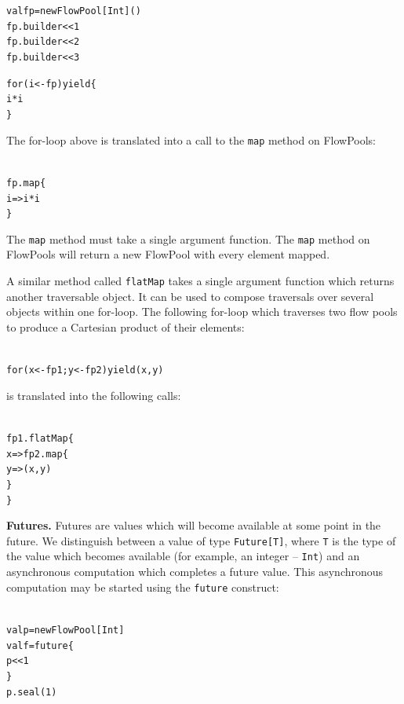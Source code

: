 \documentclass[runningheads,a4paper]{llncs}
\begin{document}
\begin{minipage}[b]{3.75 cm}
\begin{alltt}
{\scriptsize
val fp = new FlowPool[Int]()
fp.builder << 1
fp.builder << 2
fp.builder << 3

for (i <- fp) yield \{
  i * i
\}
}
\end{alltt}
\end{minipage}

The for-loop above is translated into a call to the \verb=map= method on FlowPools:

\begin{minipage}[b]{3.75 cm}
\begin{alltt}
{\scriptsize
fp.map \{
  i => i * i
\}
}
\end{alltt}
\end{minipage}

The \verb=map= method must take a single argument function.
The \verb=map= method on FlowPools will return a new FlowPool with every
element mapped.

A similar method called \verb=flatMap= takes a single argument function
which returns another traversable object.
It can be used to compose traversals over several objects within one
for-loop.
The following for-loop which traverses two flow pools to produce a
Cartesian product of their elements:

\begin{minipage}[b]{3.75 cm}
\begin{alltt}
{\scriptsize
for (x <- fp1; y <- fp2) yield (x, y)
}
\end{alltt}
\end{minipage}

is translated into the following calls:

\begin{minipage}[b]{3.75 cm}
\begin{alltt}
{\scriptsize
fp1.flatMap \{
  x => fp2.map \{
    y => (x, y)
  \}
\}
}
\end{alltt}
\end{minipage}


\textbf{Futures.}
Futures are values which will become available at some point in the future.
We distinguish between a value of type \verb=Future[T]=, where \verb=T= is
the type of the value which becomes available (for example, an
integer -- \verb=Int=) and an asynchronous computation which completes a
future value.
This asynchronous computation may be started using the \verb=future= construct:

\begin{minipage}[b]{3.75 cm}
\begin{alltt}
{\scriptsize
val p = new FlowPool[Int]
val f = future \{
  p << 1
\}
p.seal(1)
}
\end{alltt}
\end{minipage}
\end{document}
